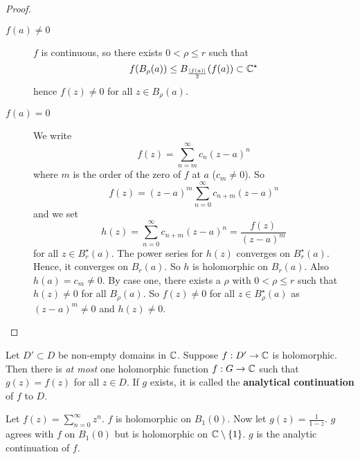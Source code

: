 \begin{proof}
    \hfill
    \begin{description}
        \item[$f(a) \neq 0$]
            $f$ is continuous, so there exists
            $0 < \rho \leq r$ such that
            \[
                f(B_\rho(a)) \leq B_{\frac{\left\lvert f(a)\right\rvert}{2}}(f(a))
                \subset \mathbb{C}^\star
            \]
            hence $f(z) \neq 0$ for all $z \in B_\rho(a)$.

        \item[$f(a) = 0$]
            We write 
            \[
                f(z) = \sum_{n = m}^\infty c_n (z-a)^n
            \]
            where $m$ is the order of the zero of $f$
            at $a$ ($c_m \neq 0$).
            So
            \[
                f(z)
                = (z-a)^m
                \sum^{\infty}_{n = 0} c_{n+m} (z-a)^n
            \]
            and we set
            \[
                h(z)
                = \sum^{\infty}_{n = 0} c_{n+m} (z-a)^n
                = \frac{f(z)}{(z-a)^m} 
            \]
            for all $z \in B_r^\star(a)$.
            The power series for $h(z)$ converges on 
            $B_r^\star(a)$.
            Hence, it converges on $B_r(a)$.
            So $h$ is holomorphic on $B_r(a)$.
            Also $h(a) = c_m \neq 0$.
            By case one, there exists a $\rho$
            with $0 < \rho \leq r$
            such that $h(z) \neq 0$
            for all $B_\rho(a)$.
            So $f(z) \neq 0$ for all $z \in B_\rho^\star(a)$
            as $(z - a)^m \neq 0$ and $h(z) \neq 0$.
    \end{description}
\end{proof}

\begin{theorem}
    Let $D' \subset D$ be non-empty domains in $\mathbb{C}$.
    Suppose $f: D' \to \mathbb{C}$ is holomorphic.
    Then there is \emph{at most} one holomorphic function
    $f: G \to \mathbb{C}$ such that $g(z) = f(z)$ for all 
    $z \in D$.
    If $g$ exists, it is called the 
    \textbf{analytical continuation} of $f$ to $D$.
\end{theorem}

\begin{example}
    Let $f(z) = \sum_{n=0}^\infty z^n$.
    $f$ is holomorphic on $B_1(0)$.
    Now let $g(z) = \frac{1}{1 - z}$.
    $g$ agrees with $f$ on $B_1(0)$ but is holomorphic on
    $\mathbb{C} \setminus \{1\}$.
    $g$ is the analytic continuation of $f$.
\end{example}

